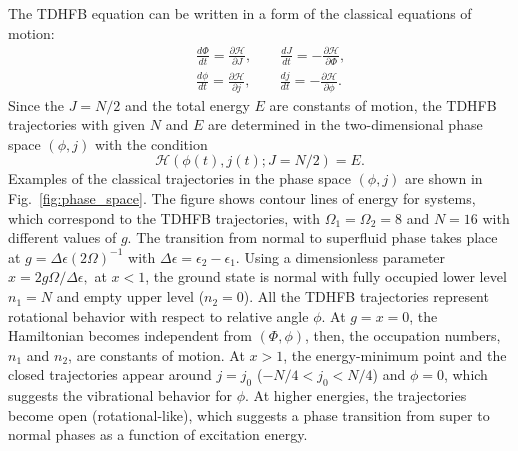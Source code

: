 \documentclass[%
superscriptaddress,
preprint,
showpacs,
nofootinbib,
amsmath,amssymb,
prc,
floatfix ]%
{revtex4-1}
\begin{document}
The TDHFB equation can be written in a form of
the classical equations of motion:
\begin{eqnarray}
	&&\frac{d\Phi}{dt} = \frac{\partial\mathcal{H}}{\partial J} ,\quad\quad
\frac{dJ}{dt} = -\frac{\partial\mathcal{H}}{\partial \Phi} , \\
	&&\frac{d\phi}{dt} = \frac{\partial\mathcal{H}}{\partial j} ,\quad\quad
\frac{dj}{dt} = -\frac{\partial\mathcal{H}}{\partial \phi} .
\label{TDHFB_equation}
\end{eqnarray}
Since the $J=N/2$ and the total energy $E$ are constants of motion,
the TDHFB trajectories with given $N$ and $E$ are determined
in the two-dimensional phase space $(\phi,j)$ with the condition
\begin{equation}
  \mathcal{H}(\phi(t),j(t);J=N/2) = E.
\end{equation}
Examples of the classical trajectories in the phase space
$(\phi,j)$ are shown in Fig.~\ref{fig:phase_space}.
The figure shows contour lines of energy for systems,
which correspond to the TDHFB trajectories,
with $\Omega_1=\Omega_2=8$ and $N=16$ with different values of $g$.
The transition from normal to superfluid phase takes place at
$g=\Delta\epsilon(2\Omega)^{-1}$ with $\Delta\epsilon=\epsilon_2-\epsilon_1$.
Using a dimensionless parameter
$
  x = 2g\Omega/\Delta\epsilon,
$
at $x<1$, the ground state is normal with fully occupied
lower level $n_1=N$ and empty upper level ($n_2=0$).
All the TDHFB trajectories represent rotational behavior with respect to
relative angle $\phi$.
At $g=x=0$, the Hamiltonian becomes independent from $(\Phi,\phi)$, then,
the occupation numbers, $n_1$ and $n_2$, are constants of motion.
At $x>1$, the energy-minimum point and the closed trajectories appear around
$j=j_0$ ($-N/4 < j_0 < N/4$) and $\phi=0$,
which suggests the vibrational behavior for $\phi$.
At higher energies, the trajectories become open (rotational-like),
which suggests a phase transition from super to normal phases
as a function of excitation energy.
\end{document}
